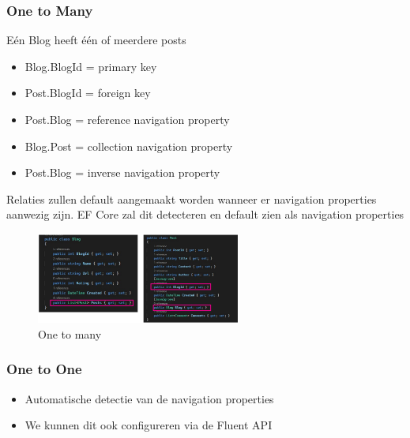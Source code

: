 \documentclass{article}
\begin{document}
\subsubsection{One to Many}

Eén Blog heeft één of meerdere posts

\begin{itemize}
    \item Blog.BlogId = primary key
    \item Post.BlogId = foreign key
    \item Post.Blog = reference navigation property
    \item Blog.Post = collection navigation property
    \item Post.Blog = inverse navigation property
\end{itemize}

Relaties zullen default aangemaakt worden wanneer er navigation properties aanwezig zijn. 
EF Core zal dit detecteren en default zien als navigation properties

\begin{figure}[H]
    \centering
    \includegraphics[width=0.6\textwidth]{efcore-relations-onetomany.png}
    \caption{One to many}
\end{figure}

\subsubsection{One to One}

\begin{itemize}
    \item Automatische detectie van de navigation properties
    \item We kunnen dit ook configureren via de Fluent API
\end{itemize}
\end{document}
